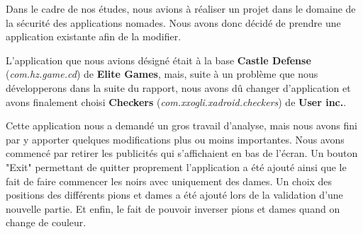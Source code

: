 Dans le cadre de nos études, nous avions à réaliser un projet dans le domaine de la sécurité des applications nomades.
Nous avons donc décidé de prendre une application existante afin de la modifier.

L'application que nous avions désigné était à la base \textbf{Castle Defense} (\textit{com.hz.game.cd}) de \textbf{Elite Games},
mais, suite à un problème que nous développerons dans la suite du rapport,
nous avons dû changer d'application et avons finalement choisi \textbf{Checkers}
(\textit{com.xxogli.xadroid.checkers}) de \textbf{User inc.}.

Cette application nous a demandé un gros travail d'analyse,
mais nous avons fini par y apporter quelques modifications plus ou moins importantes.
Nous avons commencé par retirer les publicités qui s'affichaient en bas de l'écran.
Un bouton "Exit" permettant de quitter proprement l'application a été ajouté
ainsi que le fait de faire commencer les noirs avec uniquement des dames.
Un choix des positions des différents pions et dames a été ajouté lors de la validation d'une nouvelle partie.
Et enfin, le fait de pouvoir inverser pions et dames quand on change de couleur.
